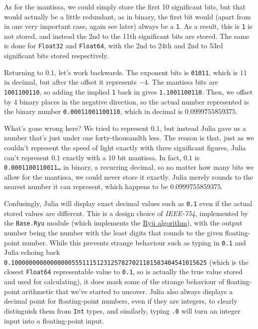 \documentclass[
  letterpaper,
  DIV=11,
  numbers=noendperiod]{scrreprt}
\begin{document}
As for the mantissa, we could simply store the first 10 significant
bits, but that would actually be a little redundant, as in binary, the
first bit would (apart from in one very important case, again see later)
always be a \texttt{1}. As a result, this is \texttt{1} is not stored,
and instead the 2nd to the 11th significant bits are stored. The same is
done for \texttt{Float32} and \texttt{Float64}, with the 2nd to 24th and
2nd to 53rd significant bits stored respectively.

Returning to \(0.1\), let's work backwards. The exponent bits is
\texttt{01011}, which is \(11\) in decimal, but after the offset it
represents \(-4\). The mantissa bits are \texttt{1001100110}, so adding
the implied \texttt{1} back in gives \texttt{1.1001100110}. Then, we
offset by 4 binary places in the negative direction, so the actual
number represented is the binary number \texttt{0.00011001100110}, which
in decimal is \(0.0999755859375\).

What's gone wrong here? We tried to represent \(0.1\), but instead Julia
gave us a number that's just under one forty-thousandth less. The reason
is that, just as we couldn't represent the speed of light exactly with
three significant figures, Julia can't represent \(0.1\) exactly with a
10 bit mantissa. In fact, \(0.1\) is \texttt{0.0001100110011…} in
binary, a recurring decimal, so no matter how many bits we allow for the
mantissa, we could never store it exactly. Julia merely rounds to the
nearest number it can represent, which happens to be
\(0.0999755859375\).

Confusingly, Julia will display exact decimal values such as
\texttt{0.1} even if the actual stored values are different. This is a
design choice of \emph{IEEE-754}, implemented by the \texttt{Base.Ryu}
module (which implements the
\href{https://dl.acm.org/doi/10.1145/3296979.3192369}{Ryū algorithm}),
with the output number being the number with the least digits that
rounds to the given floating-point number. While this prevents strange
behaviour such as typing in \texttt{0.1} and Julia echoing back
\texttt{0.1000000000000000055511151231257827021181583404541015625}
(which is the closest \texttt{Float64} representable value to
\texttt{0.1}, so is actually the true value stored and used for
calculating), it does mask some of the strange behaviour of
floating-point arithmetic that we've started to uncover. Julia also
always displays a decimal point for floating-point numbers, even if they
are integers, to clearly distinguish them from \texttt{Int} types, and
similarly, typing \texttt{.0} will turn an integer input into a
floating-point input.
\end{document}
